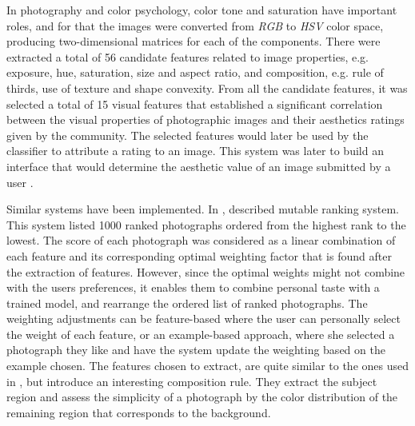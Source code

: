 In photography and color psychology, color tone and saturation have important roles, and for that the images were converted from \emph{RGB} to \emph{HSV} color space, producing two-dimensional matrices for each of the components. There were extracted a total of 56 candidate features related to image properties, e.g. exposure, hue, saturation, size and aspect ratio, and composition, e.g. rule of thirds, use of texture and shape convexity.
From all the candidate features, it was selected a total of 15 visual features that established a significant correlation between the visual properties of photographic images and their aesthetics ratings given by the community. The selected features would later be used by the classifier to attribute a rating to an image.
This system was later to build an interface that would determine the aesthetic value of an image submitted by a user \cite{Datta2010}.

Similar systems have been implemented. In \cite{Yeh}, \citeauthor{Yeh} described mutable ranking system. This system listed 1000 ranked photographs ordered from the highest rank to the lowest. The score of each photograph was considered as a linear combination of each feature and its corresponding optimal weighting factor that is found after the extraction of features. However, since the optimal weights might not combine with the users preferences, it enables them to combine personal taste with a trained model, and rearrange the ordered list of ranked photographs.
The weighting adjustments can be feature-based where the user can personally select the weight of each feature, or an example-based approach, where she selected a photograph they like and have the system update the weighting based on the example chosen.
The features chosen to extract, are quite similar to the ones used in \cite{Datta}, but introduce an interesting composition rule. They extract the subject region and assess the simplicity of a photograph by the color distribution of the remaining region that corresponds to the background.


